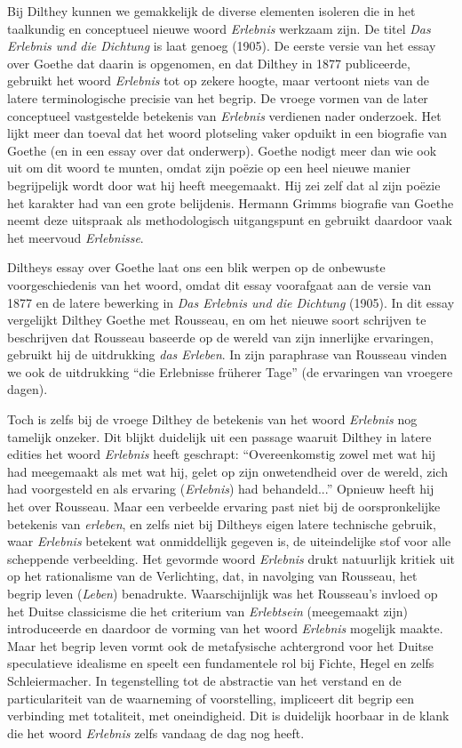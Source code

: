 Bij Dilthey kunnen we gemakkelijk de diverse elementen isoleren die in het taalkundig en conceptueel nieuwe woord \textit{Erlebnis} werkzaam zijn. De titel \textit{Das Erlebnis und die Dichtung} is laat genoeg (1905). De eerste versie van het essay over Goethe dat daarin is opgenomen, en dat Dilthey in 1877 publiceerde, gebruikt het woord \textit{Erlebnis} tot op zekere hoogte, maar vertoont niets van de latere terminologische precisie van het begrip. De vroege vormen van de later conceptueel vastgestelde betekenis van \textit{Erlebnis} verdienen nader onderzoek. Het lijkt meer dan toeval dat het woord plotseling vaker opduikt in een biografie van Goethe (en in een essay over dat onderwerp). Goethe nodigt meer dan wie ook uit om dit woord te munten, omdat zijn poëzie op een heel nieuwe manier begrijpelijk wordt door wat hij heeft meegemaakt. Hij zei zelf dat al zijn poëzie het karakter had van een grote belijdenis. Hermann Grimms biografie van Goethe neemt deze uitspraak als methodologisch uitgangspunt en gebruikt daardoor vaak het meervoud \textit{Erlebnisse}.

Diltheys essay over Goethe laat ons een blik werpen op de onbewuste voorgeschiedenis van het woord, omdat dit essay voorafgaat aan de versie van 1877 en de latere bewerking in \textit{Das Erlebnis und die Dichtung} (1905). In dit essay vergelijkt Dilthey Goethe met Rousseau, en om het nieuwe soort schrijven te beschrijven dat Rousseau baseerde op de wereld van zijn innerlijke ervaringen, gebruikt hij de uitdrukking \textit{das Erleben}. In zijn paraphrase van Rousseau vinden we ook de uitdrukking ``die Erlebnisse früherer Tage'' (de ervaringen van vroegere dagen).

Toch is zelfs bij de vroege Dilthey de betekenis van het woord \textit{Erlebnis} nog tamelijk onzeker. Dit blijkt duidelijk uit een passage waaruit Dilthey in latere edities het woord \textit{Erlebnis} heeft geschrapt: ``Overeenkomstig zowel met wat hij had meegemaakt als met wat hij, gelet op zijn onwetendheid over de wereld, zich had voorgesteld en als ervaring (\textit{Erlebnis}) had behandeld...'' Opnieuw heeft hij het over Rousseau. Maar een verbeelde ervaring past niet bij de oorspronkelijke betekenis van \textit{erleben}, en zelfs niet bij Diltheys eigen latere technische gebruik, waar \textit{Erlebnis} betekent wat onmiddellijk gegeven is, de uiteindelijke stof voor alle scheppende verbeelding. Het gevormde woord \textit{Erlebnis} drukt natuurlijk kritiek uit op het rationalisme van de Verlichting, dat, in navolging van Rousseau, het begrip leven (\textit{Leben}) benadrukte. Waarschijnlijk was het Rousseau’s invloed op het Duitse classicisme die het criterium van \textit{Erlebtsein} (meegemaakt zijn) introduceerde en daardoor de vorming van het woord \textit{Erlebnis} mogelijk maakte. Maar het begrip leven vormt ook de metafysische achtergrond voor het Duitse speculatieve idealisme en speelt een fundamentele rol bij Fichte, Hegel en zelfs Schleiermacher. In tegenstelling tot de abstractie van het verstand en de particulariteit van de waarneming of voorstelling, impliceert dit begrip een verbinding met totaliteit, met oneindigheid. Dit is duidelijk hoorbaar in de klank die het woord \textit{Erlebnis} zelfs vandaag de dag nog heeft.

